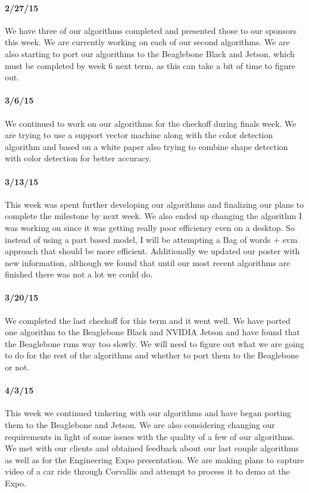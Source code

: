 \documentclass[letterpaper,10pt,titlepage]{article}
\begin{document}
    \paragraph*{2/27/15}
    We have three of our algorithms completed and presented those to our 
    sponsors this week. We are currently working on each of our second 
    algorithms. We are also starting to port our algorithms to the Beaglebone
    Black and Jetson, which must be completed by week 6 next term, as this can
    take a bit of time to figure out. 
    \paragraph*{3/6/15}
    We continued to work on our algorithms for the checkoff during finals week.
    We are trying to use a support vector machine along with the color 
    detection algorithm and based on a white paper also trying to combine shape
    detection with color detection for better accuracy. 
    \paragraph*{3/13/15}
    This week was spent further developing our algorithms and finalizing our 
    plans to complete the milestone by next week. We also ended up changing the
    algorithm I was working on since it was getting really poor efficiency even
    on a desktop. So instead of using a part based model, I will be attempting
    a Bag of words + svm approach that should be more efficient. Additionally
    we updated our poster with new information, although we found that until 
    our most recent algorithms are finished there was not a lot we could do.
    \paragraph*{3/20/15}
    We completed the last checkoff for this term and it went well. We have 
    ported one algorithm to the Beaglebone Black and NVIDIA Jetson and have 
    found that the Beaglebone runs way too slowly. We will need to figure out
    what we are going to do for the rest of the algorithms and whether to port 
    them to the Beaglebone or not. 
    \paragraph*{4/3/15}
    This week we continued tinkering with our algorithms and have began porting
    them to the Beaglebone and Jetson. We are also considering changing our
    requirements in light of some issues with the quality of a few of our 
    algorithms. We met with our clients and obtained feedback about our last 
    couple algorithms as well as for the Engineering Expo presentation. We are
    making plans to capture video of a car ride through Corvallis and attempt 
    to process it to demo at the Expo.
\end{document}
